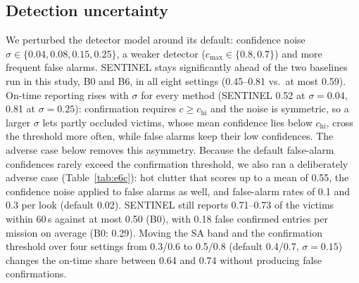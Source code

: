 \subsection{Detection uncertainty}\label{sec:eval:uncertainty}
We perturbed the detector model around its default: confidence noise
$\sigma\in\{0.04,0.08,0.15,0.25\}$, a weaker detector ($c_{\max}\in\{0.8,0.7\}$) and more frequent
false alarms. SENTINEL stays significantly ahead of the two baselines run in this study, B0 and B6, in all eight
settings (0.45--0.81 vs.\ at most 0.59). On-time reporting rises with $\sigma$ for every method
(SENTINEL 0.52 at $\sigma=0.04$, 0.81 at $\sigma=0.25$): confirmation requires $c\ge c_{\mathrm{hi}}$
and the noise is symmetric, so a larger $\sigma$ lets partly occluded victims, whose mean confidence
lies below $c_{\mathrm{hi}}$, cross the threshold more often, while false alarms keep their low
confidences. The adverse case below removes this asymmetry. Because the default false-alarm confidences rarely exceed the confirmation threshold,
we also ran a deliberately adverse case (Table~\ref{tab:e6c}): hot clutter that scores up to a mean of
0.55, the confidence noise applied to false alarms as well, and false-alarm rates of 0.1 and 0.3 per look
(default 0.02). SENTINEL still reports 0.71--0.73 of the victims within 60\,s against at most 0.50 (B0), with
0.18 false confirmed entries per mission on average (B0: 0.29). Moving the SA band and the
confirmation threshold over four settings from 0.3/0.6 to 0.5/0.8 (default 0.4/0.7, $\sigma=0.15$) changes the on-time share between 0.64 and 0.74 without
producing false confirmations.


